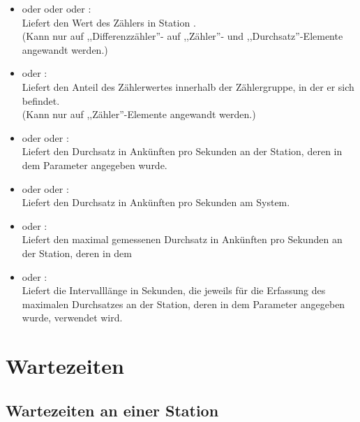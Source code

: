 \begin{itemize}

\item
{} oder  oder  oder :\\
Liefert den Wert des Zählers in Station .\\
(Kann nur auf ,,Differenzzähler''- auf ,,Zähler''- und ,,Durchsatz''-Elemente angewandt werden.)

\item
{} oder :\\
Liefert den Anteil des Zählerwertes innerhalb der Zählergruppe, in der er sich befindet.\\
(Kann nur auf ,,Zähler''-Elemente angewandt werden.)

\item
{} oder  oder :\\
Liefert den Durchsatz in Ankünften pro Sekunden an der Station, deren  in dem Parameter angegeben wurde.

\item
{} oder  oder :\\
Liefert den Durchsatz in Ankünften pro Sekunden am System.

\item
{} oder :\\
Liefert den maximal gemessenen Durchsatz in Ankünften pro Sekunden an der Station, deren  in dem 

\item
{} oder :\\
Liefert die Intervalllänge in Sekunden, die jeweils für die Erfassung des maximalen Durchsatzes an der Station, deren  in dem Parameter angegeben wurde, verwendet wird.

\end{itemize}  



\section{Wartezeiten}



\subsection{Wartezeiten an einer Station}


